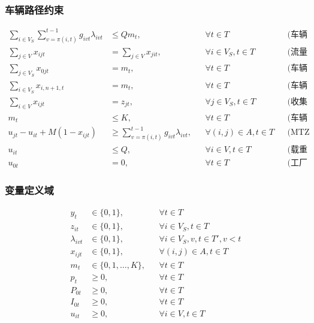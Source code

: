 \documentclass{article}
\begin{document}
\subsubsection{车辆路径约束}
\vspace{-1.5ex}
\begin{align}
\sum_{i \in V_S} \sum_{v=\pi(i,t)}^{t-1} g_{ivt}\lambda_{ivt} &\leq Q m_t, && \forall t \in T && \text{(车辆总容量限制)} \\
\sum_{j \in V} x_{ijt} &= \sum_{j \in V} x_{jit}, && \forall i \in V_S, t \in T && \text{(流量平衡约束)} \\
\sum_{j \in V_S} x_{0jt} &= m_t, && \forall t \in T && \text{(车辆从工厂出发)} \\
\sum_{i \in V_S} x_{i,n+1,t} &= m_t, && \forall t \in T && \text{(车辆返回工厂)} \\
\sum_{i \in V} x_{ijt} &= z_{jt}, && \forall j \in V_S, t \in T && \text{(收集点访问约束)} \\
m_t &\leq K, && \forall t \in T && \text{(车辆数量限制)} \\
u_{jt} - u_{it} + M(1-x_{ijt}) &\geq \sum_{v=\pi(i,t)}^{t-1} g_{ivt}\lambda_{ivt}, && \forall (i,j) \in A, t \in T && \text{(MTZ子回路消除)} \\
u_{it} &\leq Q, && \forall i \in V, t \in T && \text{(载重上限约束)} \\
u_{0t} &= 0, && \forall t \in T && \text{(工厂载重为零)}
\end{align}

\subsubsection{变量定义域}
\vspace{-1.5ex}
\begin{align}
y_t &\in \{0,1\}, && \forall t \in T \\
z_{it} &\in \{0,1\}, && \forall i \in V_S, t \in T \\
\lambda_{ivt} &\in \{0,1\}, && \forall i \in V_S, v,t \in T', v < t \\
x_{ijt} &\in \{0,1\}, && \forall (i,j) \in A, t \in T \\
m_t &\in \{0,1,\ldots,K\}, && \forall t \in T \\
p_t &\geq 0, && \forall t \in T \\
P_{0t} &\geq 0, && \forall t \in T \\
I_{0t} &\geq 0, && \forall t \in T \\
u_{it} &\geq 0, && \forall i \in V, t \in T
\end{align}
\end{document}
